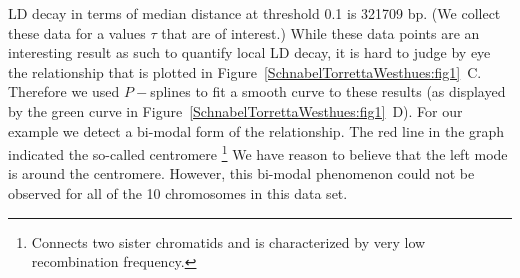 \documentclass[twoside]{report}
\begin{document}
	LD decay in terms of median distance at threshold 0.1 is 321709 bp. 
	(We collect these data for a 
	values $\tau$ that are of interest.) While these data points are an interesting result as
	such to quantify local LD decay, it is hard to judge by eye the relationship that is plotted in 
	Figure~\ref{SchnabelTorrettaWesthues:fig1}~C. Therefore we used $P-$splines to fit a smooth curve to these results (as 
	displayed by the green curve in Figure~\ref{SchnabelTorrettaWesthues:fig1}~D). For our example we detect a bi-modal form of the 
	relationship. The red line in the graph indicated the so-called centromere 
	\footnote{Connects two sister chromatids and is characterized by very low recombination frequency.} 
	We have reason to believe that the left mode is around the centromere.   
	However, this bi-modal phenomenon could not be observed for 
	all of the 10 chromosomes in this data set.   
%
\end{document}
